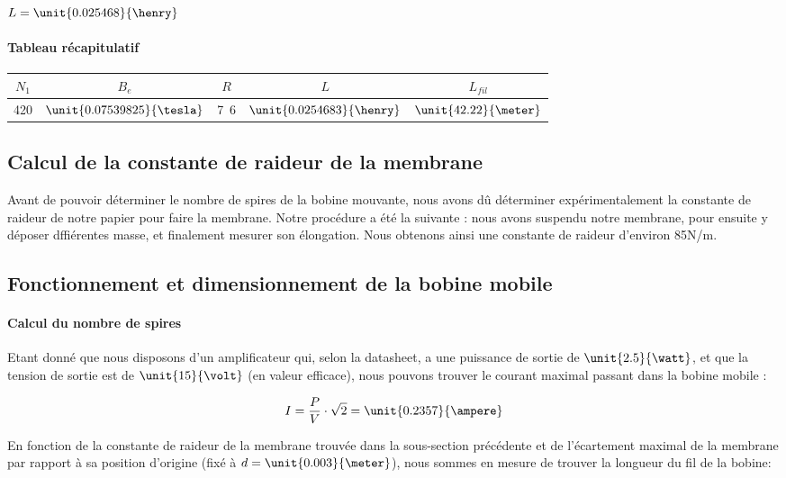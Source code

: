 $L = \unit{0.025468}{\henry}$

\paragraph{Tableau récapitulatif}

\begin{center}
	\begin{tabular}{c|c|c|c|c}
		$N_1$ & $B_e$ & $R$ & $L$ & $L_{fil}$ \\
		\hline
		420 & $\unit{0.07539825}{\tesla}$ & \unit{7.6}{\ohm} & $\unit{0.0254683}{\henry}$ & $\unit{42.22}{\meter}$\\
	\end{tabular}
\end{center}

\subsection{Calcul de la constante de raideur de la membrane}
Avant de pouvoir déterminer le nombre de spires de la bobine mouvante, nous avons dû déterminer
expérimentalement la constante de raideur de notre papier pour faire la membrane.
Notre procédure a été la suivante : nous avons suspendu notre membrane, pour ensuite 
y déposer dffiérentes masse, et finalement mesurer son élongation.
Nous obtenons ainsi une constante de raideur d'environ \unit {85}{N/m}.

\subsection{Fonctionnement et dimensionnement de la bobine mobile}

\paragraph{Calcul du nombre de spires}
Etant donné que nous disposons d'un amplificateur qui, selon la datasheet\cite{datasheetampli}‎, a une puissance de sortie de 
$\unit{2.5}{\watt}$, et que la tension de sortie est de $\unit{15}{\volt}$ (en valeur efficace), nous pouvons trouver le courant
maximal passant dans la bobine mobile :

$$I = \frac{P}{V} \cdot{\sqrt{2}} = \unit{0.2357}{\ampere}$$

En fonction de la constante de raideur de la membrane trouvée dans la sous-section précédente et de l'écartement
maximal de la membrane par rapport à sa position d'origine (fixé à $d = \unit{0.003}{\meter}$), nous sommes en
mesure de trouver la longueur du fil de la bobine:


